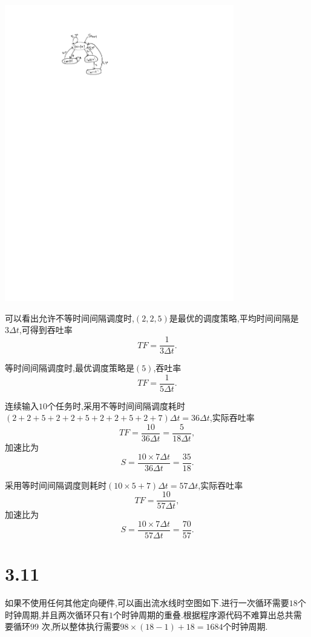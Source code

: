 \documentclass[adobefonts, nocap]{ctexart}
\begin{document}
    \begin{center}
      \includegraphics[width=10cm]{3-crop.pdf}
    \end{center}

    可以看出允许不等时间间隔调度时,$(2,2,5)$是最优的调度策略,平均时间间隔是$3\Delta t$,可得到吞吐率
    \[
      TF=\frac{1}{3\Delta t}.
    \]

    等时间间隔调度时,最优调度策略是$(5)$,吞吐率
    \[
      TF=\frac{1}{5\Delta t}.
    \]

    连续输入$10$个任务时,采用不等时间间隔调度耗时$(2+2+5+2+2+5+2+2+5+2+7)\Delta t=36\Delta t$,实际吞吐率
    \[
      TF=\frac{10}{36\Delta t}=\frac{5}{18\Delta t},
    \]
    加速比为
    \[
      S=\frac{10\times 7\Delta t}{36\Delta t}=\frac{35}{18}.
    \]

    采用等时间间隔调度则耗时$(10\times 5+7)\Delta t=57\Delta t$,实际吞吐率
    \[
      TF=\frac{10}{57\Delta t},
    \]
    加速比为
    \[
      S=\frac{10\times 7\Delta t}{57\Delta t}=\frac{70}{57}.
    \]
  \section*{3.11}
    如果不使用任何其他定向硬件,可以画出流水线时空图如下.进行一次循环需要$18$个时钟周期,并且两次循环只有$1$个时钟周期的重叠.根据程序源代码不难算出总共需要循环$99$
    次,所以整体执行需要$98\times (18-1)+18=1684$个时钟周期.
\end{document}
